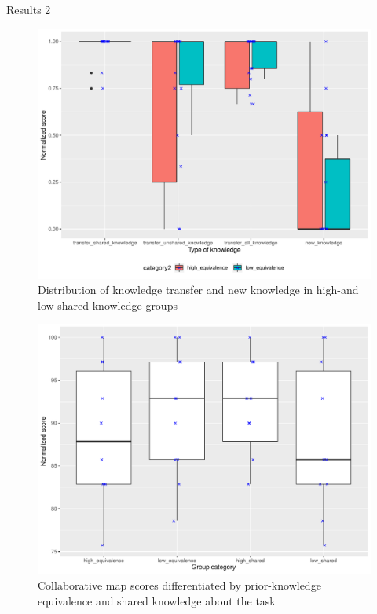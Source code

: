 \begin{frame}[allowframebreaks]{Results 2}
    \begin{figure}[tb]
     \begin{center}
      \includegraphics[width=120mm]{images/rqb_dist-equivalence-all-redraw.pdf}
      \end{center}
      \caption{Distribution of knowledge transfer and new knowledge in high-and low-shared-knowledge groups}
      \label{learn-effective}  
    \end{figure}
    
    \begin{figure}[tb]
     \begin{center}
      \includegraphics[width=120mm]{images/rqb_group-map-redraw.pdf}
      \end{center}
      \caption{Collaborative map scores differentiated by prior-knowledge 
      equivalence and shared knowledge about the task}
      \label{group-map}  
    \end{figure}
\end{frame}

